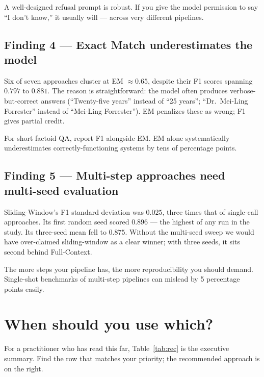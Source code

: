 \documentclass[11pt,a4paper]{article}
\begin{document}
\begin{keytakeaway}
A well-designed refusal prompt is robust. If you give the model permission to say ``I don't know,'' it usually will — across very different pipelines.
\end{keytakeaway}

\subsection{Finding 4 — Exact Match underestimates the model}

Six of seven approaches cluster at EM $\approx 0.65$, despite their F1 scores spanning $0.797$ to $0.881$. The reason is straightforward: the model often produces verbose-but-correct answers (``Twenty-five years'' instead of ``25 years''; ``Dr.~Mei-Ling Forrester'' instead of ``Mei-Ling Forrester''). EM penalizes these as wrong; F1 gives partial credit.

\begin{keytakeaway}
For short factoid QA, report F1 alongside EM. EM alone systematically underestimates correctly-functioning systems by tens of percentage points.
\end{keytakeaway}

\subsection{Finding 5 — Multi-step approaches need multi-seed evaluation}

Sliding-Window's F1 standard deviation was $0.025$, three times that of single-call approaches. Its first random seed scored $0.896$ — the highest of any run in the study. Its three-seed mean fell to $0.875$. Without the multi-seed sweep we would have over-claimed sliding-window as a clear winner; with three seeds, it sits second behind Full-Context.

\begin{keytakeaway}
The more steps your pipeline has, the more reproducibility you should demand. Single-shot benchmarks of multi-step pipelines can mislead by 5 percentage points easily.
\end{keytakeaway}

\section{When should you use which?}

For a practitioner who has read this far, Table~\ref{tab:rec} is the executive summary. Find the row that matches your priority; the recommended approach is on the right.
\end{document}
